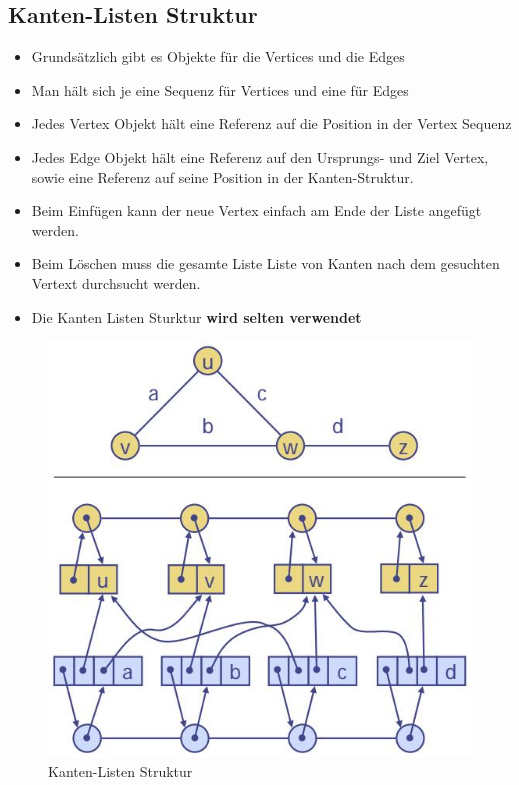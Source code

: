 \clearpage

\subsection{Kanten-Listen Struktur}
\begin{itemize}
	\item Grundsätzlich gibt es Objekte für die Vertices und die Edges
	\item Man hält sich je eine Sequenz für Vertices und eine für Edges
	\item Jedes Vertex Objekt hält eine Referenz auf die Position in der Vertex Sequenz
	\item Jedes Edge Objekt hält eine Referenz auf den Ursprungs- und Ziel Vertex, sowie eine Referenz auf seine Position in der Kanten-Struktur.
	\item Beim Einfügen kann der neue Vertex einfach am Ende der Liste angefügt werden. 
	\item Beim Löschen muss die gesamte Liste Liste von Kanten nach dem gesuchten Vertext durchsucht werden. 
	\item Die Kanten Listen Sturktur \textbf{wird selten verwendet}
\end{itemize}
\begin{figure}[h!]
\centering
\includegraphics[width=0.5\linewidth]{images/graph_kanten_listen}
\caption{Kanten-Listen Struktur}
\label{fig:graphkantenlisten}
\end{figure}
\clearpage

